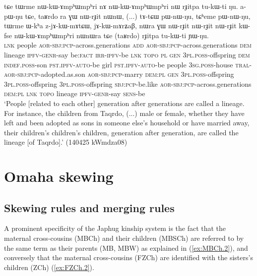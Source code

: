 \begin{exe}
\ex \label{ex:taRrdo.rJitpa}
\gll tɕe tɯrme nɯ-kɯ-ɤmpʰɯmpʰri nɤ nɯ-kɯ-ɤmpʰɯmpʰri nɯ rɟitpa tu-kɯ-ti ŋu. a-pɯ-ŋu tɕe, taʁrdo ra ɣɯ nɯ-rɟit nɯnɯ, (...) tɤ-tɕɯ pɯ-nɯ-ŋu, tɕʰeme pɯ-nɯ-ŋu,  tɯrme ɯ-kʰa z-jɤ-kɯ-mɤtɕɯ, jɤ-kɯ-mɤrʑaβ, nɯra ɣɯ nɯ-rɟit nɯ-rɟit nɯ-rɟit kɯ-fse nɯ-kɯ-ɤmpʰɯmpʰri nɯnɯra tɕe (taʁrdo) rɟitpa tu-kɯ-ti ɲɯ-ŋu. \\
\textsc{lnk} people \textsc{aor}-\textsc{sbj}:\textsc{pcp}-across.generations \textsc{add} \textsc{aor}-\textsc{sbj}:\textsc{pcp}-across.generations \textsc{dem} lineage \textsc{ipfv}-\textsc{genr}-say be:\textsc{fact} \textsc{irr}-\textsc{ipfv}-be \textsc{lnk}  \textsc{topo} \textsc{pl} \textsc{gen} \textsc{3pl}.\textsc{poss}-offspring \textsc{dem} { } \textsc{indef}.\textsc{poss}-son \textsc{pst}.\textsc{ipfv}-\textsc{auto}-be  girl  \textsc{pst}.\textsc{ipfv}-\textsc{auto}-be  people \textsc{3sg}.\textsc{poss}-house \textsc{tral}-\textsc{aor}-\textsc{sbj}:\textsc{pcp}-adopted.as.son \textsc{aor}-\textsc{sbj}:\textsc{pcp}-marry \textsc{dem}:\textsc{pl} \textsc{gen} \textsc{3pl}.\textsc{poss}-offspring  \textsc{3pl}.\textsc{poss}-offspring  \textsc{3pl}.\textsc{poss}-offspring \textsc{sbj}:\textsc{pcp}-be.like  \textsc{aor}-\textsc{sbj}:\textsc{pcp}-across.generations \textsc{dem}:\textsc{pl} \textsc{lnk}  \textsc{topo} lineage \textsc{ipfv}-\textsc{genr}-say \textsc{sens}-be \\
\glt `People [related to each other] generation after generations are called a lineage. For instance, the children from Taqrdo, (...) male or female, whether they have left and been adopted as sons in someone else's household or have married away, their children's children's children, generation after generation, are called the lineage [of Taqrdo].' (140425 kWmdza08)
\end{exe}
 
\section{Omaha skewing} \label{sec:omaha}

\subsection{Skewing rules and merging rules} \label{sec:skewing.merging}
A prominent specificity of the Japhug kinship system is the fact that the maternal cross-cousins (MBCh) and their children (MBSCh)  are referred to by the same term as their parents (MB, MBW) as explained in (\ref{ex:MBCh.2}), and conversely that the maternal cross-cousins (FZCh) are identified with the sisters's children (ZCh) (\ref{ex:FZCh.2}).  

